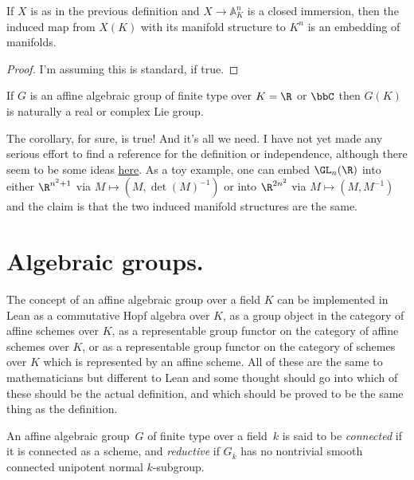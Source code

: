 \begin{theorem}\label{manifold_on_algebraic_variety_computation}\notready
    If $X$ is as in the previous definition and $X\to\mathbb{A}^n_K$ is a closed immersion, then the induced map from $X(K)$ with its manifold structure to $K^n$ is an embedding of manifolds.
\end{theorem}
\begin{proof} I'm assuming this is standard, if true.
\end{proof}
\begin{corollary}\label{lie_group_from_algebraic_group}\notready
    If $G$ is an affine algebraic group of finite type over $K=\R$ or $\bbC$ then $G(K)$ is naturally a real or complex Lie group.
\end{corollary}
\begin{remark}

    The corollary, for sure, is true! And it's all we need. I have not yet made any serious effort to find a reference for the definition or independence, although there seem to be some ideas \href{https://leanprover.zulipchat.com/#narrow/stream/116395-maths/topic/top.20space.20.2F.20manifold.20structure.20on.20points.20of.20alg.20varieties/near/431812525}{here}. As a toy example, one can embed $\GL_n(\R)$ into either $\R^{n^2+1}$ via $M\mapsto (M,\det(M)^{-1})$ or into $\R^{2n^2}$ via $M\mapsto (M,M^{-1})$ and the claim is that the two induced manifold structures are the same.
\end{remark}
\section{Algebraic groups.}

The concept of an affine algebraic group over a field $K$ can be implemented in Lean as a commutative Hopf algebra over $K$, as a group object in the category of affine schemes over $K$, as a representable group functor on the category of affine schemes over $K$, or as a representable group functor on the category of schemes over $K$ which is represented by an affine scheme. All of these are the same to mathematicians but different to Lean and some thought should go into which of these should be the actual definition, and which should be proved to be the same thing as the definition.

\begin{definition}\label{connected_reductive_group}\notready An affine algebraic group~$G$ of finite type over a field~$k$ is said to be \emph{connected} if it is connected as a scheme, and \emph{reductive} if $G_{\overline{k}}$ has no nontrivial smooth connected unipotent normal $k$-subgroup.
\end{definition}

